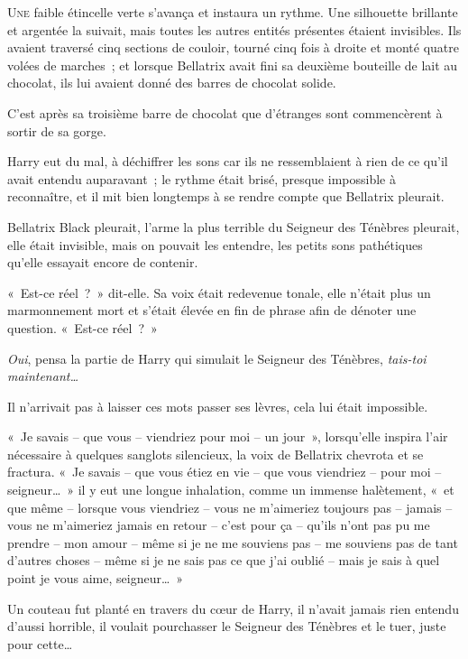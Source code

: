 
\lettrine{U}{ne} faible étincelle verte s'avança et instaura un rythme. Une silhouette brillante et argentée la suivait, mais toutes les autres entités présentes étaient invisibles. Ils avaient traversé cinq sections de couloir, tourné cinq fois à droite et monté quatre volées de marches~; et lorsque Bellatrix avait fini sa deuxième bouteille de lait au chocolat, ils lui avaient donné des barres de chocolat solide.

C'est après sa troisième barre de chocolat que d'étranges sont commencèrent à sortir de sa gorge.

Harry eut du mal, à déchiffrer les sons car ils ne ressemblaient à rien de ce qu'il avait entendu auparavant~; le rythme était brisé, presque impossible à reconnaître, et il mit bien longtemps à se rendre compte que Bellatrix pleurait.

Bellatrix Black pleurait, l'arme la plus terrible du Seigneur des Ténèbres pleurait, elle était invisible, mais on pouvait les entendre, les petits sons pathétiques qu'elle essayait encore de contenir.

«~Est-ce réel~?~» dit-elle. Sa voix était redevenue tonale, elle n'était plus un marmonnement mort et s'était élevée en fin de phrase afin de dénoter une question. «~Est-ce réel~?~»

\emph{Oui}, pensa la partie de Harry qui simulait le Seigneur des Ténèbres, \emph{tais-toi maintenant…}

Il n'arrivait pas à laisser ces mots passer ses lèvres, cela lui était impossible.

«~Je savais -- que vous -- viendriez pour moi -- un jour~», lorsqu'elle inspira l'air nécessaire à quelques sanglots silencieux, la voix de Bellatrix chevrota et se fractura. «~Je savais -- que vous étiez en vie -- que vous viendriez -- pour moi -- seigneur…~» il y eut une longue inhalation, comme un immense halètement, «~et que même -- lorsque vous viendriez -- vous ne m'aimeriez toujours pas -- jamais -- vous ne m'aimeriez jamais en retour -- c'est pour ça -- qu'ils n'ont pas pu me prendre -- mon amour -- même si je ne me souviens pas -- me souviens pas de tant d'autres choses -- même si je ne sais pas ce que j'ai oublié -- mais je sais à quel point je vous aime, seigneur…~»

Un couteau fut planté en travers du cœur de Harry, il n'avait jamais rien entendu d'aussi horrible, il voulait pourchasser le Seigneur des Ténèbres et le tuer, juste pour cette…

